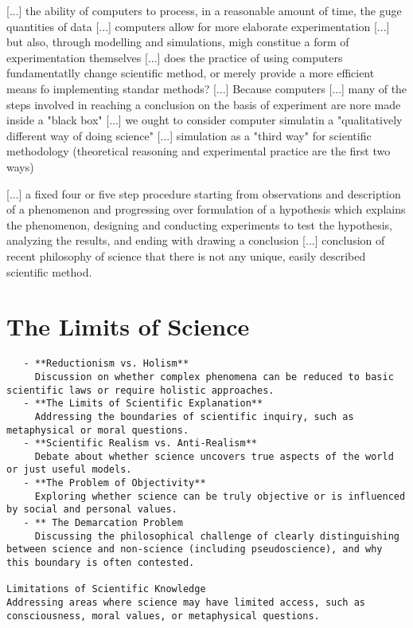 {\color{red} [...] the ability of computers to process, in a reasonable amount of time, the guge quantities of data [...] computers allow for more elaborate experimentation [...] but also, through modelling and simulations, migh constitue a form of experimentation themselves [...] does the practice of using computers fundamentatlly change scientific method, or merely provide a more efficient means fo implementing standar methods? [...] Because computers [...] many of the steps involved in reaching a conclusion on the basis of experiment are nore made inside a "black box" [...] we ought to consider computer simulatin a "qualitatively different way of doing science" [...] simulation as a "third way" for scientific methodology (theoretical reasoning and experimental practice are the first two ways)}

{\color{red} [...] a fixed four or five step procedure starting from observations and description of a phenomenon and progressing over formulation of a hypothesis which explains the phenomenon, designing and conducting experiments to test the hypothesis, analyzing the results, and ending with drawing a conclusion [...] conclusion of recent philosophy of science that there is not any unique, easily described scientific method.}


%
% 

\section{The Limits of Science}

\begin{verbatim}
   - **Reductionism vs. Holism**  
     Discussion on whether complex phenomena can be reduced to basic scientific laws or require holistic approaches.
   - **The Limits of Scientific Explanation**  
     Addressing the boundaries of scientific inquiry, such as metaphysical or moral questions.
   - **Scientific Realism vs. Anti-Realism**  
     Debate about whether science uncovers true aspects of the world or just useful models.
   - **The Problem of Objectivity**  
     Exploring whether science can be truly objective or is influenced by social and personal values.
   - ** The Demarcation Problem
     Discussing the philosophical challenge of clearly distinguishing between science and non-science (including pseudoscience), and why this boundary is often contested.

Limitations of Scientific Knowledge
Addressing areas where science may have limited access, such as consciousness, moral values, or metaphysical questions.

\end{verbatim}


